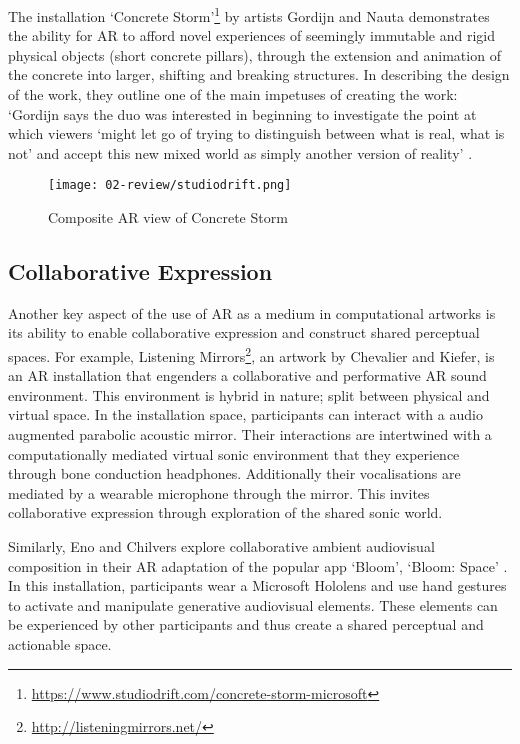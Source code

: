 The installation `Concrete Storm'\footnote{\url{https://www.studiodrift.com/concrete-storm-microsoft}} by artists Gordijn and Nauta demonstrates the ability for AR to afford novel experiences of seemingly immutable and rigid physical objects (short concrete pillars), through the extension and animation of the concrete into larger, shifting and breaking structures. In describing the design of the work, they outline one of the main impetuses of creating the work: `Gordijn says the duo was interested in beginning to investigate the point at which viewers `might let go of trying to distinguish between what is real, what is not' and accept this new mixed world as simply another version of reality' \citep{gottschalk2017}. 

\begin{figure}[ht]
    \centering
    \texttt{[image: 02-review/studiodrift.png]}
    \captionsetup{justification=centering,margin=1.5cm}
    \caption{Composite AR view of Concrete Storm \citep[from][]{gordijn2017}}
\end{figure}\label{fig: concretestorm}

\subsection{Collaborative Expression}\label{sec: ar-arts-collaboration}
Another key aspect of the use of AR as a medium in computational artworks is its ability to enable collaborative expression and construct shared perceptual spaces. For example, Listening Mirrors\footnote{\url{http://listeningmirrors.net/}}, an artwork by Chevalier and Kiefer, \citeyearpar{chevalier2018} is an AR installation that engenders a collaborative and performative AR sound environment. This environment is hybrid in nature; split between physical and virtual space. In the installation space, participants can interact with a audio augmented parabolic acoustic mirror. Their interactions are intertwined with a computationally mediated virtual sonic environment that they experience through bone conduction headphones. Additionally their vocalisations are mediated by a wearable microphone through the mirror. This invites collaborative expression through exploration of the shared sonic world.

Similarly, Eno and Chilvers explore collaborative ambient audiovisual composition in their AR adaptation of the popular app `Bloom', `Bloom: Space' \citep{eno2018}. In this installation, participants wear a Microsoft Hololens and use hand gestures to activate and manipulate generative audiovisual elements. These elements can be experienced by other participants and thus create a shared perceptual and actionable space.

